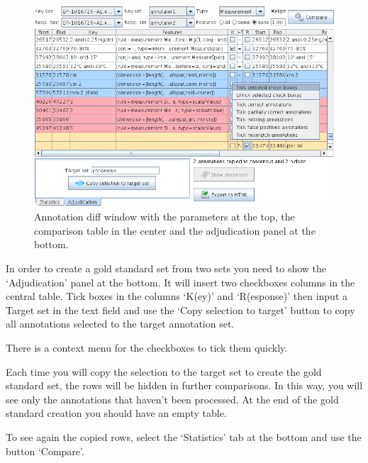 \begin{figure}[htbp]
\begin{center}
\includegraphics[width=14cm]{annotation-diff-adjudication.png}
\end{center}
\caption{Annotation diff window with the parameters at the top,
the comparison table in the center and the adjudication panel at the
bottom.}
\label{fig:annotdiff2}
\end{figure}

In order to create a gold standard set from two sets you need to show the
`Adjudication' panel at the bottom. It will insert two checkboxes columns in
the central table. Tick boxes in the columns `K(ey)' and `R(esponse)' then
input a Target set in the text field and use the `Copy selection to target'
button to copy all annotations selected to the target annotation set.

There is a context menu for the checkboxes to tick them quickly.

Each time you will copy the selection to the target set to create the gold
standard set, the rows will be hidden in further comparisons. In this way,
you will see only the annotations that haven't been processed. At the end of
the gold standard creation you should have an empty table.

To see again the copied rows, select the `Statistics' tab at the bottom and
use the button `Compare'.


